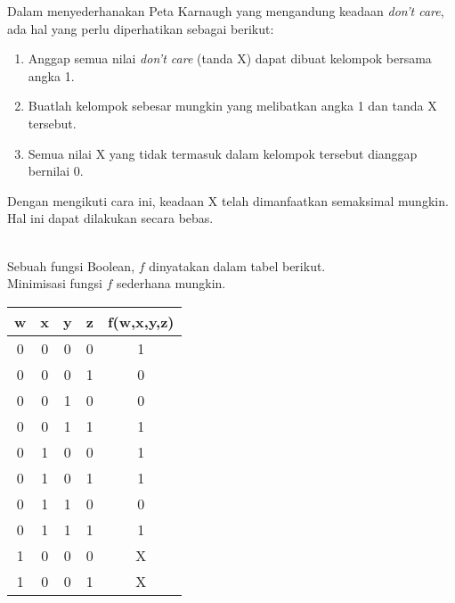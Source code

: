 \documentclass[11pt]{article}
\theoremstyle{definitionstyle}
\theoremstyle{theoremstyle}
\theoremstyle{examplestyle}
\begin{document}
Dalam menyederhanakan Peta Karnaugh yang mengandung keadaan \textit{don't care}, ada hal yang perlu diperhatikan sebagai berikut:
\begin{enumerate}[left=0pt, itemsep=1.5pt, topsep=1.5pt]
    \item Anggap semua nilai \textit{don't care} (tanda X) dapat dibuat kelompok bersama angka 1.
    \item Buatlah kelompok sebesar mungkin yang melibatkan angka 1 dan tanda X tersebut.
    \item Semua nilai X yang tidak termasuk dalam kelompok tersebut dianggap bernilai 0.
\end{enumerate}

Dengan mengikuti cara ini, keadaan X telah dimanfaatkan semaksimal mungkin. Hal ini dapat dilakukan secara bebas.
\begin{example} \hfill \\
    Sebuah fungsi Boolean, $f$ dinyatakan dalam tabel berikut. \\
    Minimisasi fungsi $f$ sederhana mungkin.
    \begin{center}
    \begin{tabular}{|c|c|c|c|c|}
        \hline
        \textbf{w} & \textbf{x} & \textbf{y} & \textbf{z} & \textbf{f(w,x,y,z)} \\ \hline
        0          & 0          & 0          & 0          & 1                   \\ \hline
        0          & 0          & 0          & 1          & 0                   \\ \hline
        0          & 0          & 1          & 0          & 0                   \\ \hline
        0          & 0          & 1          & 1          & 1                   \\ \hline
        0          & 1          & 0          & 0          & 1                   \\ \hline
        0          & 1          & 0          & 1          & 1                   \\ \hline
        0          & 1          & 1          & 0          & 0                   \\ \hline
        0          & 1          & 1          & 1          & 1                   \\ \hline
        1          & 0          & 0          & 0          & X                   \\ \hline
        1          & 0          & 0          & 1          & X                   \\ \hline

\end{tabular}
\end{center}
\end{example}
\end{document}

